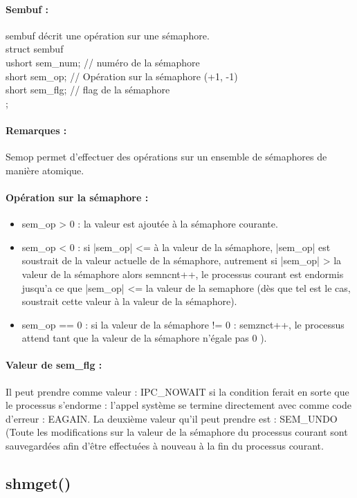 \documentclass{article}[12pt]
\begin{document}
\paragraph{Sembuf : } sembuf décrit une opération sur une sémaphore.\\
struct sembuf {\\
ushort sem\_num; // numéro de la sémaphore\\
short sem\_op; // Opération sur la sémaphore (+1, -1)\\
short sem\_flg; // flag de la sémaphore \\
}; 
\paragraph{Remarques : } Semop permet d'effectuer des opérations sur un ensemble de sémaphores de manière atomique. 
\paragraph{Opération sur la sémaphore : }
\begin{itemize}
\item sem\_op > 0 : la valeur est ajoutée à la sémaphore courante.
\item sem\_op < 0 : si |sem\_op| <= à la valeur de la sémaphore, |sem\_op| est soustrait de la valeur actuelle de la sémaphore, autrement si |sem\_op| > la valeur de la sémaphore alors semncnt++, le processus courant est endormis jusqu'a ce que |sem\_op| <= la valeur de la semaphore (dès que tel est le cas, soustrait cette valeur à la valeur de la sémaphore).
\item sem\_op == 0 : si la valeur de la sémaphore != 0 : semznct++, le processus attend tant que la valeur de la sémaphore n’égale pas 0 ).
\end{itemize}
\paragraph{Valeur de sem\_flg : } Il peut prendre comme valeur : IPC\_NOWAIT si la condition ferait en sorte que le processus s'endorme : l'appel système se termine directement avec comme code d'erreur : EAGAIN. La deuxième valeur qu'il peut prendre est : SEM\_UNDO (Toute les modifications sur la valeur de la sémaphore du processus courant sont sauvegardées afin d'être effectuées à nouveau à la fin du processus courant. 
\subsection{shmget()}
\end{document}

